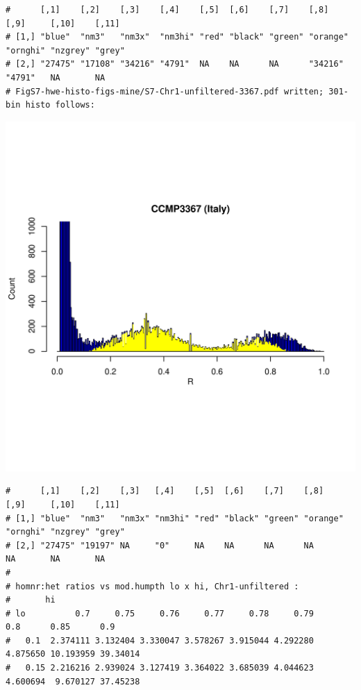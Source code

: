 \documentclass{article}\usepackage[]{graphicx}\usepackage[]{color}
\makeatletter
\def\maxwidth{ %
  \ifdim\Gin@nat@width>\linewidth
    \linewidth
  \else
    \Gin@nat@width
  \fi
}
\newenvironment{kframe}{%
 \def\at@end@of@kframe{}%
 \ifinner\ifhmode%
  \def\at@end@of@kframe{\end{minipage}}%
  \begin{minipage}{\columnwidth}%
 \fi\fi%
 \def\FrameCommand##1{\hskip\@totalleftmargin \hskip-\fboxsep
 \colorbox{shadecolor}{##1}\hskip-\fboxsep
     \hskip-\linewidth \hskip-\@totalleftmargin \hskip\columnwidth}%
 \MakeFramed {\advance\hsize-\width
   \@totalleftmargin\z@ \linewidth\hsize
   \@setminipage}}%
 {\par\unskip\endMakeFramed%
 \at@end@of@kframe}
\newenvironment{knitrout}{}{} %
\makeatother
\begin{document}
\begin{knitrout}
\begin{kframe}\begin{verbatim}
#      [,1]    [,2]    [,3]    [,4]    [,5]  [,6]    [,7]    [,8]     [,9]     [,10]    [,11] 
# [1,] "blue"  "nm3"   "nm3x"  "nm3hi" "red" "black" "green" "orange" "ornghi" "nzgrey" "grey"
# [2,] "27475" "17108" "34216" "4791"  NA    NA      NA      "34216"  "4791"   NA       NA    
# FigS7-hwe-histo-figs-mine/S7-Chr1-unfiltered-3367.pdf written; 301-bin histo follows:
\end{verbatim}
\end{kframe}
\includegraphics[width=\maxwidth]{FigS7-hwe-histo-figs-knitr/unnamed-chunk-10-25} 
\begin{kframe}\begin{verbatim}
#      [,1]    [,2]    [,3]   [,4]    [,5]  [,6]    [,7]    [,8]     [,9]     [,10]    [,11] 
# [1,] "blue"  "nm3"   "nm3x" "nm3hi" "red" "black" "green" "orange" "ornghi" "nzgrey" "grey"
# [2,] "27475" "19197" NA     "0"     NA    NA      NA      NA       NA       NA       NA
# 
# homnr:het ratios vs mod.humpth lo x hi, Chr1-unfiltered :
#       hi
# lo          0.7     0.75     0.76     0.77     0.78     0.79      0.8      0.85      0.9
#   0.1  2.374111 3.132404 3.330047 3.578267 3.915044 4.292280 4.875650 10.193959 39.34014
#   0.15 2.216216 2.939024 3.127419 3.364022 3.685039 4.044623 4.600694  9.670127 37.45238

\end{verbatim}
\end{kframe}
\end{knitrout}
\end{document}

